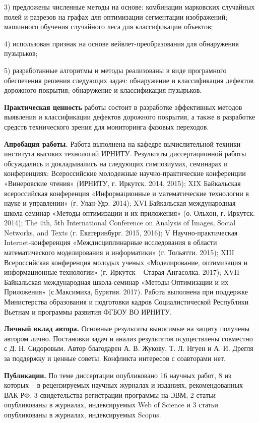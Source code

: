 3) предложены численные методы на основе: комбинации марковских случайных полей и разрезов на графах для оптимизации сегментации изображений; машинного обучения случайного леса для классификации объектов;

4) использован признак на основе вейвлет-преобразования для обнаружения пузырьков;

5) разработанные алгоритмы и методы реализованы в виде програмного обеспечения решения следующих задач: обнаружение и классификация дефектов дорожного покрытия; обнаружение и классификация пузырьков.


\textbf{Практическая ценность} работы состоит в разработке эффективных методов выявления и классификации дефектов дорожного покрытия, а также в разработке средств технического зрения для мониторинга фазовых переходов.

\textbf{Апробация работы.} Работа выполнена на кафедре вычислительной техники института высоких технологий ИРНИТУ. Результаты диссертационной работы обсуждались и докладывались на следующих симпозиумах, семинарах и конференциях: Всероссийские молодежные научно-практические конференции «Винеровские чтения» (ИРНИТУ, г. Иркутск. 2014, 2015); XIX Байкальская всероссийская конференция «Информационные и математические технологии в науке и управлении» (г. Улан-Удэ. 2014); XVI Байкальская международная школа-семинар «Методы оптимизации и их приложения» (о. Ольхон, г. Иркутск. 2014); The 4th, 5th International Conference on Analysis of Images, Social Networks, and Texts (г. Екатеринбург. 2015, 2016); V Научно-практическая Internet-конференция «Междисциплинарные исследования в области математического моделирования и информатики» (г. Тольятти. 2015); XIII Всероссийская конференция молодых ученых «Моделирование, оптимизация и информационные технологии» (г. Иркутск – Старая Ангасолка. 2017); XVII Байкальская международная школа-семинар «Методы Оптимизации и их Приложения» (с.Максимиха, Бурятия. 2017). Работа выполнена при поддержке Министерства образования и подготовки кадров Социалистической Республики Вьетнам и программы развития ФГБОУ ВО ИРНИТУ.

\textbf{Личный вклад автора.} Основные результаты выносимые на защиту получены автором лично. Постановки задач и анализ результатов осуществлены совместно с Д. Н. Сидоровым. Автор благодарен А. В. Жукову, Т. Л. Нгуен и А. И. Дрегля за поддержку и ценные советы. Конфликта интересов с соавторами нет.

\textbf{Публикации.} По теме диссертации опубликовано 16 научных работ, 8 из которых – в рецензируемых научных журналах и изданиях, рекомендованных ВАК РФ, 3 свидетельства регистрации программы на ЭВМ, 2 статьи опубликованы в журналах, индексируемых Web of Science и 3 статьи опубликованы в журналах, индексируемых Scopus.

